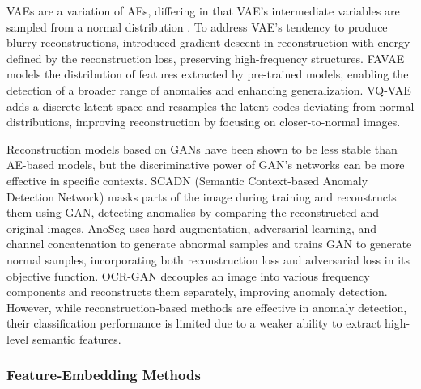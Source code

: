 VAEs are a variation of AEs, differing in that VAE's intermediate variables are sampled from a normal distribution \cite{liu2020towards, dehaene2020iterative}. To address VAE's tendency to produce blurry reconstructions, \cite{dehaene2020iterative} introduced gradient descent in reconstruction with energy defined by the reconstruction loss, preserving high-frequency structures. FAVAE \cite{dehaene2020anomaly} models the distribution of features extracted by pre-trained models, enabling the detection of a broader range of anomalies and enhancing generalization. VQ-VAE \cite{wang2020image} adds a discrete latent space and resamples the latent codes deviating from normal distributions, improving reconstruction by focusing on closer-to-normal images. 

Reconstruction models based on GANs have been shown to be less stable than AE-based models, but the discriminative power of GAN's networks can be more effective in specific contexts. SCADN (Semantic Context-based Anomaly Detection Network) \cite{yan2021learning} masks parts of the image during training and reconstructs them using GAN, detecting anomalies by comparing the reconstructed and original images. AnoSeg \cite{song2021anoseg} uses hard augmentation, adversarial learning, and channel concatenation to generate abnormal samples and trains GAN to generate normal samples, incorporating both reconstruction loss and adversarial loss in its objective function. OCR-GAN \cite{liang2023omni} decouples an image into various frequency components and reconstructs them separately, improving anomaly detection. However, while reconstruction-based methods are effective in anomaly detection, their classification performance is limited due to a weaker ability to extract high-level semantic features.

\subsubsection*{Feature-Embedding Methods}

